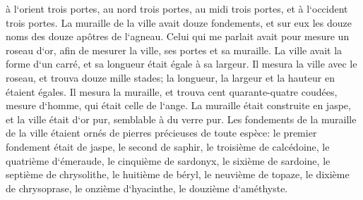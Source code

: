 \verse à l`orient trois portes, au nord trois portes, au midi trois portes, et à l`occident trois portes. 
\verse La muraille de la ville avait douze fondements, et sur eux les douze noms des douze apôtres de l`agneau. 
\verse Celui qui me parlait avait pour mesure un roseau d`or, afin de mesurer la ville, ses portes et sa muraille. 
\verse La ville avait la forme d`un carré, et sa longueur était égale à sa largeur. Il mesura la ville avec le roseau, et trouva douze mille stades; la longueur, la largeur et la hauteur en étaient égales. 
\verse Il mesura la muraille, et trouva cent quarante-quatre coudées, mesure d`homme, qui était celle de l`ange. 
\verse La muraille était construite en jaspe, et la ville était d`or pur, semblable à du verre pur. 
\verse Les fondements de la muraille de la ville étaient ornés de pierres précieuses de toute espèce: le premier fondement était de jaspe, le second de saphir, le troisième de calcédoine, le quatrième d`émeraude, 
\verse le cinquième de sardonyx, le sixième de sardoine, le septième de chrysolithe, le huitième de béryl, le neuvième de topaze, le dixième de chrysoprase, le onzième d`hyacinthe, le douzième d`améthyste. 
